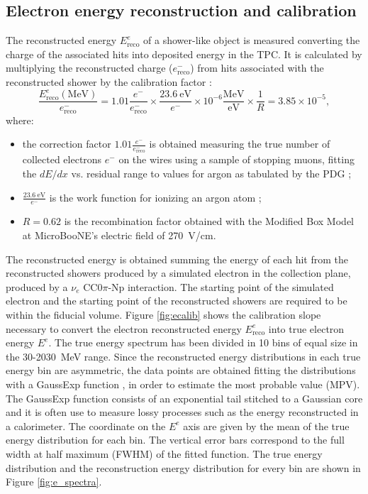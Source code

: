 \subsection{Electron energy reconstruction and calibration}\label{sec:showerenergy}
The reconstructed energy $E_{\mathrm{reco}}^{e}$ of a shower-like object is measured converting the charge of the associated hits into deposited energy in the TPC. It is calculated by multiplying the reconstructed charge ($e^{-}_{\mathrm{reco}}$) from hits associated with the reconstructed shower by the calibration factor \cite{Acciarri:2017sjy}:
\begin{equation}
\frac{E_{\mathrm{reco}}^{e} \mathrm{(MeV)}}{e^{-}_{\mathrm{reco}}} = 1.01\frac{e^-}{e^{-}_{\mathrm{reco}}} \times \frac{23.6~\mathrm{eV}}{e^-} \times 10^{-6} \frac{\mathrm{MeV}}{\mathrm{eV}} \times \frac{1}{R} = 3.85\times10^{-5},\label{eq:calib}
\end{equation}
where:
\begin{itemize}

\item the correction factor $1.01\frac{e^-}{e^{-}_{\mathrm{reco}}}$ is obtained measuring the true number of collected electrons $e^{-}$ on the wires using a sample of stopping muons, fitting the $dE/dx$ vs. residual range to values for argon as tabulated by the PDG \cite{PhysRevD.98.030001};
\item $\frac{23.6~\mathrm{eV}}{e^-}$ is the work function for ionizing an argon atom \cite{Shibamura:1975zz};
\item $R = 0.62$ is the recombination factor obtained with the Modified Box Model \cite{Acciarri:2013met} at MicroBooNE's electric field of 270~V/cm.
\end{itemize}

The reconstructed energy is obtained summing the energy of each hit from the reconstructed showers produced by a simulated electron in the collection plane, produced by a $\nu_{e}$ CC0$\pi$-Np interaction. The starting point of the simulated electron and the starting point of the reconstructed showers are required to be within the fiducial volume. 
Figure \ref{fig:ecalib} shows the calibration slope necessary to convert the electron reconstructed energy $E_{\mathrm{reco}}^{e}$ into true electron energy $E^{e}$. The true energy spectrum has been divided in 10 bins of equal size in the 30-2030~MeV range. Since the reconstructed energy distributions in each true energy bin are asymmetric, the data points are obtained fitting the distributions with a GaussExp function \cite{Das:2016stf}, in order to estimate the most probable value (MPV). The GaussExp function consists of an exponential tail stitched to a Gaussian core and it is often use to measure lossy processes such as the energy reconstructed in a calorimeter. The coordinate on the $E^{e}$ axis are given by the mean of the true energy distribution for each bin. The vertical error bars correspond to the full width at half maximum (FWHM) of the fitted function. The true energy distribution and the reconstruction energy distribution for every bin are shown in Figure \ref{fig:e_spectra}.

